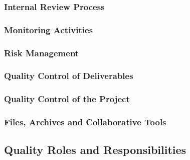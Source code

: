 \documentclass[
  11pt,
]{article}
\begin{document}
\hypertarget{internal-review-process}{%
\subsubsection{Internal Review Process}\label{internal-review-process}}

\hypertarget{monitoring-activities}{%
\subsubsection{Monitoring Activities}\label{monitoring-activities}}

\hypertarget{risk-management}{%
\subsubsection{Risk Management}\label{risk-management}}

\hypertarget{quality-control-of-deliverables}{%
\subsubsection{Quality Control of
Deliverables}\label{quality-control-of-deliverables}}

\hypertarget{quality-control-of-the-project}{%
\subsubsection{Quality Control of the
Project}\label{quality-control-of-the-project}}

\hypertarget{files-archives-and-collaborative-tools}{%
\subsubsection{Files, Archives and Collaborative
Tools}\label{files-archives-and-collaborative-tools}}

\hypertarget{quality-roles-and-responsibilities}{%
\subsection{Quality Roles and
Responsibilities}\label{quality-roles-and-responsibilities}}
\end{document}
